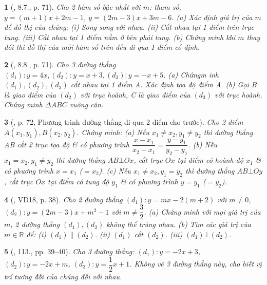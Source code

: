 \documentclass{article}
\newtheorem{baitoan}{}
\begin{document}
\begin{baitoan}[\cite{Binh_boi_duong_Toan_9_tap_1}, 8.7., p. 71]
	Cho 2 hàm số bậc nhất với $m$: tham số, $y = (m + 1)x + 2m - 1$, $y = (2m - 3)x + 3m - 6$. (a) Xác định giá trị của $m$ để đồ thị của chúng: (i) Song song với nhau. (ii) Cắt nhau tại 1 điểm trên trục tung. (iii) Cắt nhau tại 1 điểm nằm ở bên phải tung. (b) Chứng minh khi $m$ thay đổi thì đồ thị của mỗi hàm số trên đều đi qua 1 điểm cố định.
\end{baitoan}

\begin{baitoan}[\cite{Binh_boi_duong_Toan_9_tap_1}, 8.8., p. 71]
	Cho 3 đường thẳng $(d_1):y = 4x,(d_2):y = x + 3,(d_3):y = -x + 5$. (a) Chứngm inh $(d_1),(d_2),(d_3)$ cắt nhau tại 1 điểm A. Xác định tọa độ điểm A. (b) Gọi B là giao điểm của $(d_2)$ với trục hoành, C là giao điểm của $(d_3)$ với trục hoành. Chứng minh $\Delta ABC$ vuông cân.
\end{baitoan}

\begin{baitoan}[\cite{Binh_boi_duong_Toan_9_tap_1}, p. 72, Phương trình đường thẳng đi qua 2 điểm cho trước]
	Cho 2 điểm $A(x_1,y_1),B(x_2,y_2)$. Chứng minh: (a) Nếu $x_1\ne x_2,y_1\ne y_2$ thì đường thẳng AB cắt 2 trục tọa độ \& có phương trình $\dfrac{x - x_1}{x_2 - x_1} = \dfrac{y - y_1}{y_2 - y_1}$. (b) Nếu $x_1 = x_2,y_1\ne y_2$ thì đường thẳng $AB\bot Ox$, cắt trục $Ox$ tại điểm có hoành độ $x_1$ \& có phương trình $x = x_1$ ($= x_2$). (c) Nếu $x_1\ne x_2,y_1 = y_2$ thì đường thẳng $AB\bot Oy$, cắt trục $Ox$ tại điểm có tung độ $y_1$ \& có phương trình $y = y_1$ ($= y_2$).
\end{baitoan}

\begin{baitoan}[\cite{Tuyen_Toan_9_old}, VD18, p. 38]
	Cho 2 đường thẳng $(d_1):y = mx - 2(m + 2)$ với $m\ne0$, $(d_2):y = (2m - 3)x + m^2 - 1$ với $m\ne\dfrac{3}{2}$. (a) Chứng minh với mọi giá trị của $m$, 2 đường thẳng $(d_1),(d_2)$ không thể trùng nhau. (b) Tìm các giá trị của $m\in\mathbb{R}$ để: (i) $(d_1)\parallel(d_2)$. (ii) $(d_1)$ cắt $(d_2)$. (iii) $(d_1)\bot(d_2)$.
\end{baitoan}

\begin{baitoan}[\cite{Tuyen_Toan_9_old}, 113., pp. 39--40]
	Cho 3 đường thẳng: $(d_1):y = -2x + 3$, $(d_2):y = -2x + m$, $(d_3):y = \dfrac{1}{2}x + 1$. Không vẽ 3 đường thẳng này, cho biết vị trí tương đối của chúng đối với nhau.
\end{baitoan}
\end{document}
